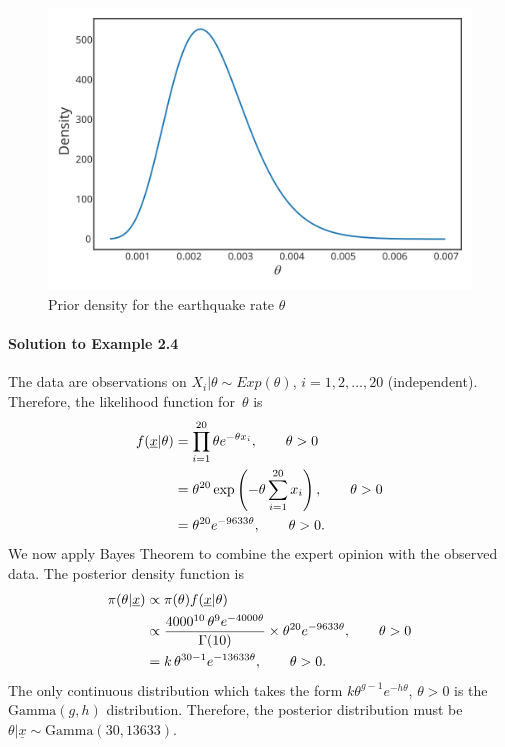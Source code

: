 {\begin{figure}[ht]
\includegraphics{images/priorplot4.svg}
\caption{Prior density for the earthquake rate $\theta$}
\label{fig:earthprior}

\end{figure}

\newpage

\paragraph{Solution to Example 2.4}{
    
    The data are observations on $X_i|\theta\sim Exp(\theta)$, $i=1,2,\ldots,20$ (independent). Therefore, the likelihood function for~$\theta$ is
    \begin{align}
    \label{eq:earthlik}
    f(\underline{x}|\theta)&=\prod_{i=1}^{20} \theta e^{-\theta x_i}, 
    \quad\quad\theta>0 \notag \\
    &=\theta^{20}\exp\left(-\theta\sum_{i=1}^{20} x_i\right),
    \quad\quad\theta>0 \notag \\
    &=\theta^{20} e^{-9633\theta},
    \quad\quad\theta>0. 
    \end{align}
    We now apply Bayes Theorem to combine the expert opinion with the observed data. The posterior density function is
    \begin{align}
    \label{eq:earthpost}
    \pi(\theta|\underline{x})&\propto\pi(\theta)f(\underline{x}|\theta) \notag \\
    &\propto\frac{4000^{10}\,\theta^{9}e^{-4000\theta}}{\Gamma(10)}\times
    \theta^{20} e^{-9633\theta},\quad\quad\theta>0 \notag  \\
    &=k\,\theta^{30-1}e^{-13633\theta},\quad\quad\theta>0.
    \end{align}
    The only continuous distribution which takes the form
    $k\theta^{g-1}e^{-h\theta}$, $\theta>0$ is the $\text{Gamma}(g,h)$ distribution.
    Therefore, the posterior distribution must be $\theta|\underline{x}\sim
    \text{Gamma}(30,13633)$.
    
}}
